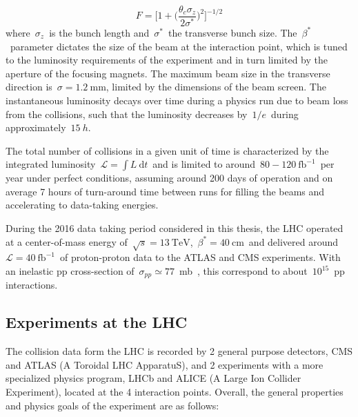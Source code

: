 \begin{equation}
F = \biggl[1 + \bigr( \frac{\theta_c \sigma_z}{2 \sigma^*} \bigr)^2 \biggr]^{-1/2}
\end{equation}
where~$\sigma_z$~is the bunch length and~$\sigma^*$~the transverse bunch size. The~$\beta^*$~parameter dictates the size of the beam at the interaction point, which is tuned to the luminosity requirements of the experiment and in turn limited by the aperture of the focusing magnets. The maximum beam size in the transverse direction is~$\sigma=1.2~\mathrm{mm}$, limited by the dimensions of the beam screen. The instantaneous luminosity decays over time during a physics run due to beam loss from the collisions, such that the luminosity decreases by~$1/e$~during approximately~$15\ h$.

The total number of collisions in a given unit of time is characterized by the integrated luminosity~$\mathcal{L} = \int L\ \mathrm{d}t$~and is limited to around~$80-120~\mathrm{fb}^{-1}$~per year under perfect conditions, assuming around 200 days of operation and on average 7 hours of turn-around time between runs for filling the beams and accelerating to data-taking energies.

During the 2016 data taking period considered in this thesis, the LHC operated at a center-of-mass energy of~$\sqrt{s} = 13~\mathrm{TeV}$,~$\beta^* = 40~\mathrm{cm}$~and delivered around~$\mathcal{L} = 40~\mathrm{fb}^{-1}$~of proton-proton data to the ATLAS and CMS experiments. With an inelastic pp cross-section of~$\sigma_{pp} \simeq 77$~mb~\cite{VanHaevermaet:2016gnh}, this correspond to about~$10^{15}$~pp interactions.

\subsection{Experiments at the LHC}
The collision data form the LHC is recorded by 2 general purpose detectors, CMS and ATLAS (A Toroidal LHC ApparatuS), and 2 experiments with a more specialized physics program, LHCb and ALICE (A Large Ion Collider Experiment), located at the 4 interaction points. Overall, the general properties and physics goals of the experiment are as follows:

